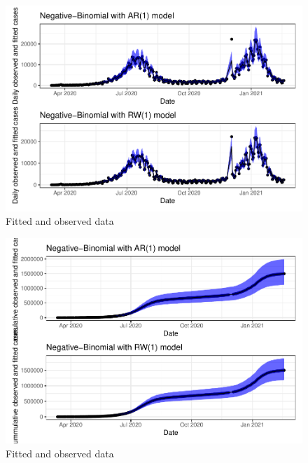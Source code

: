 \documentclass[10pt,letterpaper]{article}
\begin{document}
\begin{figure}
\includegraphics[width=0.99\linewidth]{COVIDincidenceSA_files/figure-latex/unnamed-chunk-6-1} \caption{Fitted and observed data}\label{fig:unnamed-chunk-6-1}
\end{figure}
\begin{figure}
\includegraphics[width=0.99\linewidth]{COVIDincidenceSA_files/figure-latex/unnamed-chunk-6-2} \caption{Fitted and observed data}\label{fig:unnamed-chunk-6-2}
\end{figure}
\end{document}
